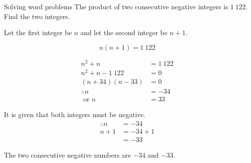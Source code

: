 \begin{wex}
{Solving word problems}
{The product of two consecutive negative integers is $1~122$. Find the two integers.}
{
Let the first integer be $n$ and let the second integer be $n+1$. 

\begin{equation*}
  n(n+1) = 1~122
\end{equation*}

\begin{align*}
  n^{2} + n &= 1~122 \\
  n^{2} + n - 1~122 &= 0 \\
  (n+34)(n-33) &= 0 \\
  \therefore  n &= -34 \\
  \mbox{ or } n &= 33
\end{align*}

It is given that both integers must be negative.
\begin{align*}
  \therefore n &= -34 \\
  n + 1 &= -34 + 1 \\
  &= -33
\end{align*}

The two consecutive negative numbers are $-34$ and $-33$.
}
\end{wex}

